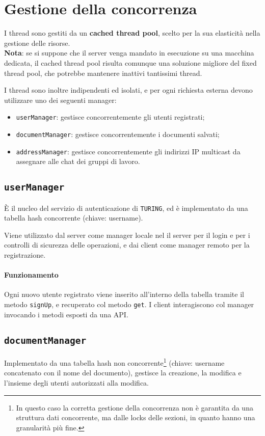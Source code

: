 \section{Gestione della concorrenza}
I thread sono gestiti da un \textbf{cached thread pool}, scelto per la sua elasticità nella gestione delle risorse.\\
\textbf{Nota}: se si suppone che il server venga mandato in esecuzione su una macchina dedicata, il cached thread pool risulta comunque una soluzione migliore del fixed thread pool, che potrebbe mantenere inattivi tantissimi thread.

\medskip

I thread sono inoltre indipendenti ed isolati, e per ogni richiesta esterna devono utilizzare uno dei seguenti manager:

\begin{itemize}
	\item \texttt{userManager}: gestisce concorrentemente gli utenti registrati;
	\item \texttt{documentManager}: gestisce concorrentemente i documenti salvati;
	\item \texttt{addressManager}: gestisce concorrentemente gli indirizzi IP multicast da assegnare alle chat dei gruppi di lavoro.
\end{itemize}

\subsection{\texttt{userManager}}
È il nucleo del servizio di autenticazione di \texttt{TURING}, ed è implementato da una tabella hash concorrente (chiave: username).

Viene utilizzato dal server come manager locale nel il server per il login e per i controlli di sicurezza delle operazioni, e dai client come manager remoto per la registrazione.

\paragraph{Funzionamento}
Ogni nuovo utente registrato viene inserito all'interno della tabella tramite il metodo \texttt{signUp}, e recuperato col metodo \texttt{get}.
I client interagiscono col manager invocando i metodi esposti da una API.

\subsection{\texttt{documentManager}}
Implementato da una tabella hash non concorrente\footnote{In questo caso la corretta gestione della concorrenza non è garantita da una struttura dati concorrente, ma dalle locks delle sezioni, in quanto hanno una granularità più fine.} (chiave: username concatenato con il nome del documento), gestisce la creazione, la modifica e l'insieme degli utenti autorizzati alla modifica.


